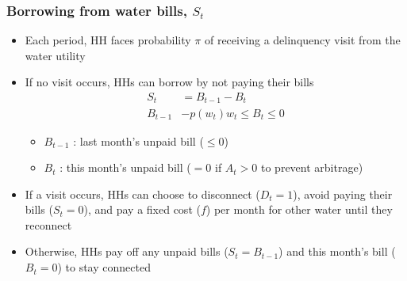 \documentclass[aspectratio=149]{beamer}
\begin{document}
\begin{frame}
\frametitle{Borrowing from water bills, $S_t$}

\begin{itemize}
\item Each period, HH faces probability $\pi$ of receiving a delinquency visit from the water utility
\item If no visit occurs, HHs can borrow by not paying their bills
\begin{align*}
S_t &= B_{t-1} -  B_{t} \\
B_{t-1} &-  p(w_t) w_t \leq B_{t} \leq 0 
\end{align*}

\begin{itemize}
  \item $B_{t-1}$ : last month's unpaid bill { \footnotesize ($\leq0$) }
  \item $B_{t}$ : this month's unpaid bill { \footnotesize ($=0$ if $A_t>0$ to prevent arbitrage)}
\end{itemize}
\vspace{2mm}


\item If a visit occurs, HHs can choose to disconnect ($D_{t}=1$), avoid paying their bills ($S_t  = 0$), and pay a fixed cost ($f$) per month for other water until they reconnect

\item Otherwise, HHs pay off any unpaid bills ($S_t=B_{t-1}$) and this month's bill ($B_{t}=0$) to stay connected

\end{itemize}

\end{frame}







\end{document}
